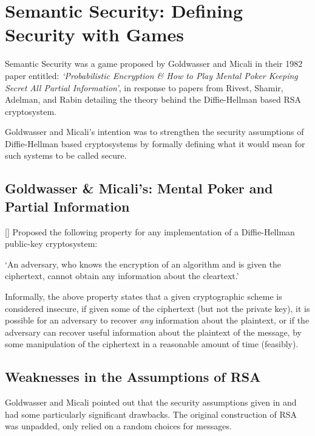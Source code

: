 \section{Semantic Security: Defining Security with Games} 

Semantic Security was a game proposed by Goldwasser and Micali in their 1982 paper entitled: \textit{`Probabilistic Encryption \& How to Play Mental Poker Keeping Secret All Partial Information'}\cite{Gol1982}, in response to papers from Rivest, Shamir, Adelman, \cite{Riv1978} and Rabin \cite{Rab1979} detailing the theory behind the Diffie-Hellman based RSA cryptosystem. 

Goldwasser and Micali's intention was to strengthen the security assumptions of Diffie-Hellman based cryptosystems by formally defining what it would mean for such systems to be called secure. 


\subsection{Goldwasser \& Micali's: Mental Poker and Partial Information} 


[\cite{Gol1982}] Proposed the following property for any implementation of a Diffie-Hellman public-key cryptosystem:  

\medskip

\begin{prot}
	`An adversary, who knows the encryption of an algorithm and is given the ciphertext, cannot obtain any information about the cleartext.'
\end{prot}\cite{Gol1982}


Informally, the above property states that a given cryptographic scheme is considered insecure, if given some of the ciphertext (but not the private key), it is possible for an adversary to recover \emph{any} information about the plaintext, or if the adversary can recover useful information about the plaintext of the message, by some manipulation of the ciphertext in a reasonable amount of time (feasibly). 



\subsection{Weaknesses in the Assumptions of RSA} 


Goldwasser and Micali pointed out that the security assumptions given in \cite{Rab1979} and \cite{Riv1978} had some particularly significant drawbacks. The original construction of RSA was unpadded, only relied on a random choices for messages. 

